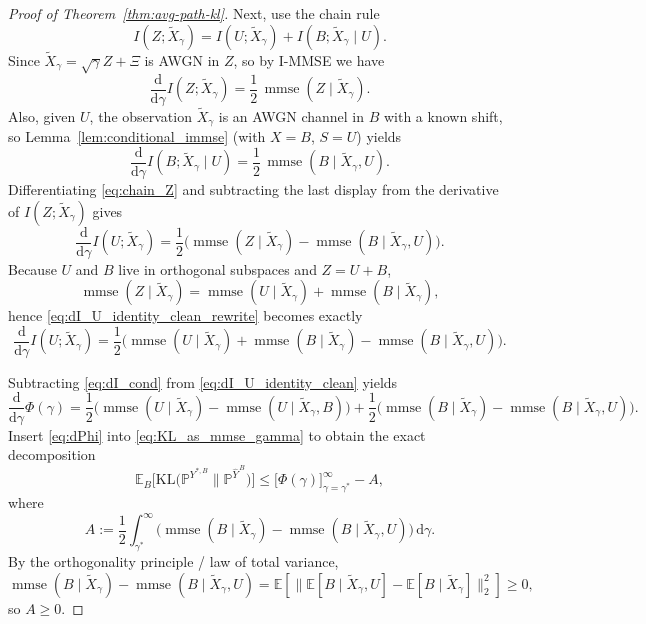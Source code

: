 \documentclass[twoside,11pt]{article}
\DeclareMathOperator{\mmse}{mmse}
\newcommand{\E}{\mathbb{E}}
\newcommand{\PP}{\mathbb{P}}
\newcommand{\dd}{\mathrm{d}}
\newcommand{\KL}{\mathrm{KL}}
\numberwithin{equation}{section}
\begin{document}
\begin{proof}[Proof of Theorem~\ref{thm:avg-path-kl}]
Next, use the chain rule
\begin{equation}\label{eq:chain_Z}
I(Z;\tilde{X}_\gamma)=I(U;\tilde{X}_\gamma)+I(B;\tilde{X}_\gamma\mid U).
\end{equation}
Since $\tilde{X}_\gamma=\sqrt{\gamma}Z+\Xi$ is AWGN in $Z$, so by I-MMSE we have 
\[
\frac{\dd}{\dd\gamma}I(Z;\tilde{X}_\gamma)=\frac12\,\mmse(Z\mid \tilde{X}_\gamma).
\]
Also, given $U$, the observation $\tilde{X}_\gamma$ is an AWGN channel in $B$ with a known shift,
so Lemma~\ref{lem:conditional_immse} (with $X=B$, $S=U$) yields
\[
\frac{\dd}{\dd\gamma}I(B;\tilde{X}_\gamma\mid U)=\frac12\,\mmse(B\mid \tilde{X}_\gamma,U).
\]
Differentiating \eqref{eq:chain_Z} and subtracting the last display from the derivative of $I(Z;\tilde{X}_\gamma)$ gives
\begin{equation}\label{eq:dI_U_identity_clean_rewrite}
\frac{\dd}{\dd\gamma}I(U;\tilde{X}_\gamma)
=\frac12\Big(\mmse(Z\mid \tilde{X}_\gamma)-\mmse(B\mid \tilde{X}_\gamma,U)\Big).
\end{equation}
Because $U$ and $B$ live in orthogonal subspaces and $Z=U+B$,
\[
\mmse(Z\mid \tilde{X}_\gamma)
=\mmse(U\mid \tilde{X}_\gamma)+\mmse(B\mid \tilde{X}_\gamma),
\]
hence \eqref{eq:dI_U_identity_clean_rewrite} becomes exactly
\begin{equation}\label{eq:dI_U_identity_clean}
\frac{\dd}{\dd\gamma}I(U;\tilde{X}_\gamma)
=\frac12\Big(\mmse(U\mid \tilde{X}_\gamma)+\mmse(B\mid \tilde{X}_\gamma)-\mmse(B\mid \tilde{X}_\gamma,U)\Big).
\end{equation}

Subtracting \eqref{eq:dI_cond} from \eqref{eq:dI_U_identity_clean} yields
\begin{equation}\label{eq:dPhi}
\frac{\dd}{\dd\gamma}\Phi(\gamma)
=\frac12\Big(\mmse(U\mid \tilde{X}_\gamma)-\mmse(U\mid \tilde{X}_\gamma,B)\Big)
+\frac12\Big(\mmse(B\mid \tilde{X}_\gamma)-\mmse(B\mid \tilde{X}_\gamma,U)\Big).
\end{equation}
Insert \eqref{eq:dPhi} into \eqref{eq:KL_as_mmse_gamma} to obtain the exact decomposition
\begin{equation}\label{eq:KL_equals_boundary_minus_A_clean}
\E_B\!\Big[\KL\!\big(\PP^{Y^{*,B}}\big\|\PP^{\hat Y^{\,B}}\big)\Big]
\leq \Big[\Phi(\gamma)\Big]_{\gamma=\gamma^*}^{\infty}-A,
\end{equation}
where
\begin{equation*}
A:=\frac12\int_{\gamma^*}^{\infty}
\Big(\mmse(B\mid \tilde{X}_\gamma)-\mmse(B\mid \tilde{X}_\gamma,U)\Big)\,\dd\gamma.
\end{equation*}
By the orthogonality principle / law of total variance,
\[
\mmse(B\mid \tilde{X}_\gamma)-\mmse(B\mid \tilde{X}_\gamma,U)
=\E\!\left[\big\|\E[B\mid \tilde{X}_\gamma,U]-\E[B\mid \tilde{X}_\gamma]\big\|_2^2\right]\ge 0,
\]
so $A\ge 0$.



\end{proof}
\end{document}

